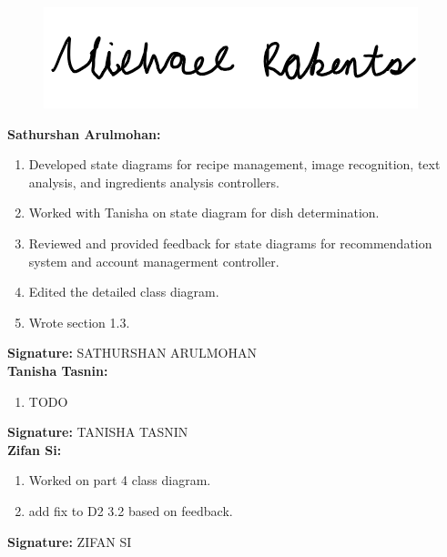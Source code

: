 \documentclass[]{article}
\begin{document}
\begin{figure}[H]
 	\centering
    \includegraphics[width=\textwidth]{image/A_Michael_Roberts_Signature.png}
\end{figure}

\textbf{Sathurshan Arulmohan:}
\begin{enumerate}
	\item Developed state diagrams for recipe management, image recognition, text analysis, and ingredients analysis controllers.
	\item Worked with Tanisha on state diagram for dish determination.
	\item Reviewed and provided feedback for state diagrams for recommendation system and account managerment controller.
	\item Edited the detailed class diagram.
	\item Wrote section 1.3.
\end{enumerate}

\textbf{Signature:} SATHURSHAN ARULMOHAN \\

\textbf{Tanisha Tasnin:}
\begin{enumerate}
	\item TODO
\end{enumerate}

\textbf{Signature:} TANISHA TASNIN \\

\textbf{Zifan Si:}
\begin{enumerate}
	\item Worked on part 4 class diagram.
	\item add fix to D2 3.2 based on feedback.
\end{enumerate}

\textbf{Signature:} ZIFAN SI  \\
\end{document}
